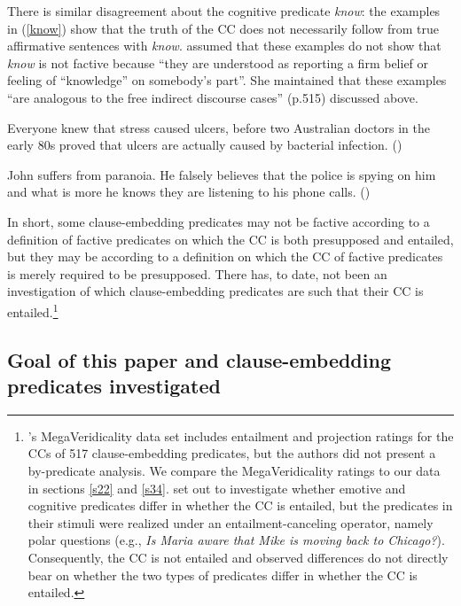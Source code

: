 \documentclass[11pt,fleqn]{article}
\newcommand{\6}{\mbox{$[\hspace*{-.6mm}[$}}
\newcommand{\9}{\mbox{$]\hspace*{-.6mm}]$}}
\newcommand{\citepos}[1]{\citeauthor{#1}'s \citeyear{#1}}
\begin{document}
There is similar disagreement about the cognitive predicate {\em know}: the examples in (\ref{know}) show that the truth of the CC does not necessarily follow from true affirmative sentences with {\em know}. \citet{abrusan2011} assumed that these examples do not show that {\em know} is not factive because ``they are understood as reporting a firm belief or feeling of ``knowledge'' on somebody's part''. She maintained that these examples ``are analogous to the free indirect discourse cases'' (p.515) discussed above.

\begin{exe}
\ex\label{know}
\begin{xlist}
\ex Everyone knew that stress caused ulcers, before two Australian doctors in the early 80s proved that ulcers are actually caused by bacterial infection. \hfill (\citealt[501]{hazlett2010})

\ex John suffers from paranoia. He falsely believes that the police is spying on him and what is more he knows they are listening to his phone calls. \hfill (\citealt[514]{abrusan2011})
\end{xlist}
\end{exe}

In short, some clause-embedding predicates may not be factive according to a definition of factive predicates on which the CC is both presupposed and entailed, but they may be according to a definition on which the CC of factive predicates is merely required to be presupposed. There has, to date, not been an investigation of which clause-embedding predicates are such that their CC is entailed.\footnote{\citepos{white-rawlins-nels2018} MegaVeridicality data set includes entailment and projection ratings for the CCs of 517 clause-embedding predicates, but the authors did not present a by-predicate analysis. We compare the MegaVeridicality ratings to our data in sections \ref{s22} and  \ref{s34}. \citet{djaerv-etal2016} set out to investigate whether emotive and cognitive predicates differ in whether the CC is entailed, but the predicates in their stimuli were realized under an entailment-canceling operator, namely polar questions (e.g., {\em Is Maria aware that Mike is moving back to Chicago?}). Consequently, the CC is not entailed and observed differences do not directly bear on whether the two types of predicates differ in whether the CC is entailed.} 

\subsection{Goal of this paper and clause-embedding predicates investigated}
\end{document}
